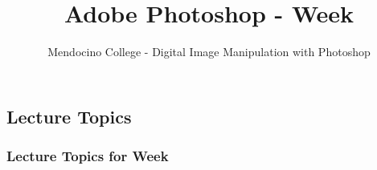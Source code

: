 \documentclass{beamer}
\title{Adobe Photoshop - Week }
\author{Mendocino College - Digital Image Manipulation with Photoshop}
\date{\vspace{-5em}}
\begin{document}
	{
		\begin{frame}
			\vspace{-35pt}
			\maketitle
		\end{frame}
	}

	\section{}
			\subsection{Lecture Topics}		
	\begin{frame}
		\frametitle{Lecture Topics for Week }
				\begin{outline}
					\1 
					\1 
					\1 
					\1 
				\end{outline}
		\end{frame}

	\section{}
			\subsection{}		
				\begin{frame}
					\frametitle{}
					\begin{outline}
						\1 
						\1 
						\1 
						\1 
						\1 
						\1 
					\end{outline}
				\end{frame}
			
	\section{}
		\subsection{}		
			\begin{frame}
				\frametitle{}
				\begin{outline}
					\1 
					\1 
					\1 
					\1 
				\end{outline}
			\end{frame}
			
	\section{}
\end{document}
